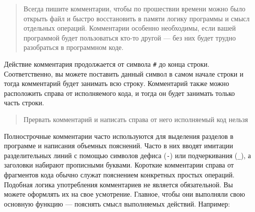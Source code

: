 \documentclass[]{book}
\newenvironment{Shaded}{\begin{snugshade}}{\end{snugshade}}
\newcommand{\DecValTok}[1]{\textcolor[rgb]{0.00,0.00,0.81}{#1}}
\newcommand{\StringTok}[1]{\textcolor[rgb]{0.31,0.60,0.02}{#1}}
\newcommand{\CommentTok}[1]{\textcolor[rgb]{0.56,0.35,0.01}{\textit{#1}}}
\newcommand{\OperatorTok}[1]{\textcolor[rgb]{0.81,0.36,0.00}{\textbf{#1}}}
\newcommand{\NormalTok}[1]{#1}
\begin{document}
\begin{quote}
Всегда пишите комментарии, чтобы по прошествии времени можно было
открыть файл и быстро восстановить в памяти логику программы и смысл
отдельных операций. Комментарии особенно необходимы, если вашей
программой будет пользоваться кто-то другой --- без них будет трудно
разобраться в программном коде.
\end{quote}

Действие комментария продолжается от символа \texttt{\#} до конца
строки. Соответственно, вы можете поставить данный символ в самом начале
строки и тогда комментарий будет занимать всю строку. Комментарий также
можно расположить справа от исполняемого кода, и тогда он будет занимать
только часть строки.

\begin{quote}
Прервать комментарий и написать справа от него исполняемый код нельзя
\end{quote}

Полнострочные комментарии часто используются для выделения разделов в
программе и написания объемных пояснений. Часто в них вводят имитации
разделительных линий с помощью символов дефиса (\texttt{-}) или
подчеркивания (\texttt{\_}), а заголовки набирают прописными буквами.
Короткие комментарии справа от фрагментов кода обычно служат пояснением
конкретных простых операций. Подобная логика употребления комментариев
не является обязательной. Вы можете оформлять их на свое усмотрение.
Главное, чтобы они выполняли свою основную функцию --- пояснять смысл
выполняемых действий. Например:

\begin{Shaded}
\end{Shaded}
\end{document}
